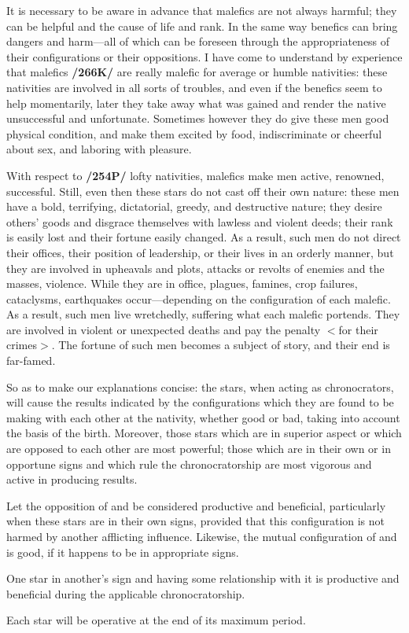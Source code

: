 It is necessary to be aware in advance that malefics are not always harmful; they can be helpful and the cause of life and rank. In the same way benefics can bring dangers and harm—all of which can be foreseen through the appropriateness of their configurations or their oppositions. I have come to understand by experience that malefics \textbf{/266K/} are really malefic for average or humble nativities: these nativities are involved in all sorts of troubles, and even if the benefics seem to help momentarily, later they take away what was gained and render the native unsuccessful and unfortunate. Sometimes however they do give these men good physical condition, and make them excited by food, indiscriminate or cheerful about sex, and laboring with pleasure.

With respect to \textbf{/254P/} lofty nativities, malefics make men active, renowned, successful. Still, even then these stars do not cast off their own nature: these men have a bold, terrifying, dictatorial, greedy, and destructive nature; they desire others’ goods and disgrace themselves with lawless and violent deeds; their rank is easily lost and their fortune easily changed. As a result, such men do not direct their offices, their position of leadership, or their lives in an orderly manner, but they are involved in upheavals and plots, attacks or revolts of enemies and the masses, violence. While they are in office, plagues, famines, crop failures, cataclysms, earthquakes occur—depending on the configuration of each malefic. As a result, such men live wretchedly, suffering what each malefic portends. They are involved in violent or unexpected deaths and pay the penalty $<$for their crimes$>$. The fortune of such men becomes a subject of story, and
their end is far-famed. 

So as to make our explanations concise: the stars, when acting as chronocrators, will cause the results indicated by the configurations which they are found to be making with each other at the nativity, whether good or bad, taking into account the basis of the birth. Moreover, those stars which are in superior aspect or which are opposed to each other are most powerful; those which are in their own or in opportune signs and which rule the chronocratorship are most vigorous and active in producing results. 

Let the opposition of \Saturn\xspace and \Jupiter\xspace be considered productive and beneficial, particularly when these stars are in their own
signs, provided that this configuration is not harmed by another afflicting influence. Likewise, the mutual configuration of \Jupiter\xspace and \Mars\xspace is good, if it happens to be in appropriate signs. 

One star in another’s sign and having some relationship with it is productive and beneficial during the applicable chronocratorship. 

Each star will be operative at the end of its maximum period.

\newpage